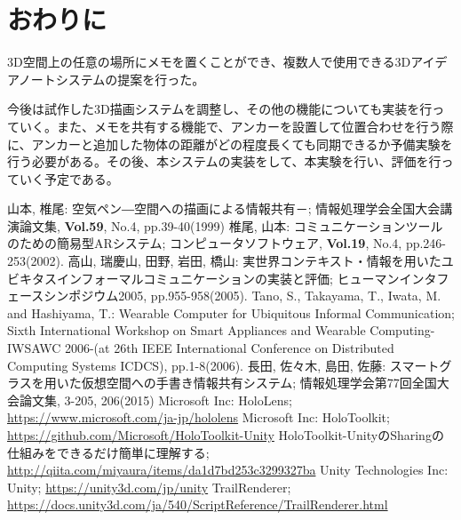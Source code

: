 \documentclass{hissymp}
\begin{document}
\section{おわりに}
3D空間上の任意の場所にメモを置くことができ、複数人で使用できる3Dアイデアノートシステムの提案を行った。

今後は試作した3D描画システムを調整し、その他の機能についても実装を行っていく。また、メモを共有する機能で、アンカーを設置して位置合わせを行う際に、アンカーと追加した物体の距離がどの程度長くても同期できるか予備実験を行う必要がある。その後、本システムの実装をして、本実験を行い、評価を行っていく予定である。
\begin{thebibliography}{99}
        山本, 椎尾:
        空気ペン―空間への描画による情報共有－;
        情報処理学会全国大会講演論文集,
        {\bf Vol.59}, No.4, pp.39-40(1999)
	椎尾, 山本:
	コミュニケーションツールのための簡易型ARシステム;
	コンピュータソフトウェア, 
        {\bf Vol.19}, No.4, pp.246-253(2002).
	高山, 瑞慶山, 田野, 岩田, 橋山:
	実世界コンテキスト・情報を用いたユビキタスインフォーマルコミュニケーションの実装と評価;
	ヒューマンインタフェースシンポジウム2005,
        pp.955-958(2005).
        Tano, S., Takayama, T., Iwata, M. and Hashiyama, T.:
        Wearable Computer for Ubiquitous Informal Communication;
        Sixth International Workshop on Smart Appliances and Wearable Computing-IWSAWC 2006-(at 26th IEEE International Conference on Distributed Computing Systems ICDCS),
        pp.1-8(2006).
        長田, 佐々木, 島田, 佐藤:
        スマートグラスを用いた仮想空間への手書き情報共有システム;
        情報処理学会第77回全国大会論文集,
        3-205, 206(2015)
        Microsoft Inc:
        HoloLens;
        \url{https://www.microsoft.com/ja-jp/hololens}
        Microsoft Inc:
        HoloToolkit;
        \url{https://github.com/Microsoft/HoloToolkit-Unity}
        HoloToolkit-UnityのSharingの仕組みをできるだけ簡単に理解する; 
        \url{http://qiita.com/miyaura/items/da1d7bd253c3299327ba}
        Unity Technologies Inc:
        Unity;
        \url{https://unity3d.com/jp/unity}
        TrailRenderer;
        \url{https://docs.unity3d.com/ja/540/ScriptReference/TrailRenderer.html}

\end{thebibliography}
\end{document}
